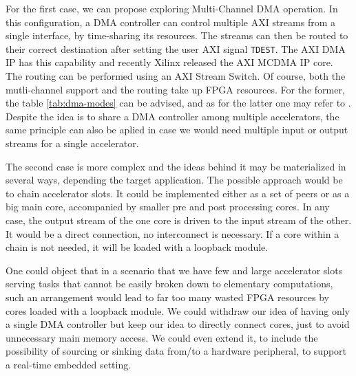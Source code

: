 For the first case, we can propose exploring Multi-Channel DMA operation. In this configuration, a DMA controller can control
multiple AXI streams from a single interface, by time-sharing its resources. The streams can then be routed to their correct
destination after setting the user AXI signal \texttt{TDEST}. The AXI DMA IP has this capability and recently Xilinx released
the AXI MCDMA IP core. The routing can be performed using an AXI Stream Switch. Of course, both the mutli-channel support and
the routing take up FPGA resources. For the former, the table \ref{tab:dma-modes} can be advised, and as for the latter
one may refer to \cite{pg085}. Despite the idea is to share a DMA controller among multiple accelerators, the same
principle can also be aplied in case we would need multiple input or output streams for a single accelerator.

The second case is more complex and the ideas behind it may be materialized in several ways, depending the target application.
The possible approach would be to chain accelerator slots. It could be implemented either as a set of peers or as a big main
core, accompanied by smaller pre and post processing cores. In any case, the output stream of the one core is driven to the
input stream of the other. It would be a direct connection, no interconnect is necessary. If a core within a chain is not needed,
it will be loaded with a loopback module.

One could object that in a scenario that we have few and large accelerator slots serving tasks that cannot be easily broken down
to elementary computations, such an arrangement would lead to far too many wasted FPGA resources by cores loaded with a loopback module.
We could withdraw our idea of having only a single DMA controller but keep our idea to directly connect cores, just to avoid
unnecessary main memory access. We could even extend it, to include the possibility of sourcing or sinking data from/to a
hardware peripheral, to support a real-time embedded setting.

